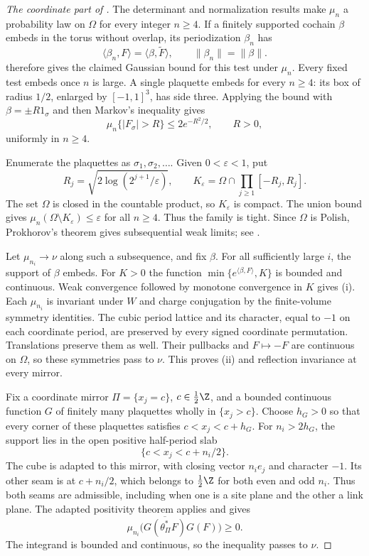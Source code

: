 \begin{proof}[The coordinate part of ]
The determinant and normalization results make $\mu_n$ a probability
law on $\Omega$ for every integer $n\ge4$. If a finitely supported
cochain $\beta$ embeds in the torus without overlap, its
periodization $\beta_n$ has
\[
 \langle\beta_n,F\rangle=\langle\beta,\widetilde F\rangle,
 \qquad \|\beta_n\|=\|\beta\|.
\]
 therefore gives the claimed Gaussian
bound for this test under $\mu_n$. Every fixed test embeds once
$n$ is large. A single plaquette embeds for every $n\ge4$: its
box of radius $1/2$, enlarged by $[-1,1]^3$, has side three.
Applying the bound with $\beta=\pm R1_\sigma$ and then Markov's
inequality gives
\[
 \mu_n\{|F_\sigma|>R\}\le2e^{-R^2/2},\qquad R>0,
\]
uniformly in $n\ge4$.

Enumerate the plaquettes as $\sigma_1,\sigma_2,\ldots$. Given
$0<\varepsilon<1$, put
\[
 R_j=\sqrt{2\log(2^{j+1}/\varepsilon)},\qquad
 K_\varepsilon=\Omega\cap\prod_{j\ge1}[-R_j,R_j].
\]
The set $\Omega$ is closed in the countable product, so
$K_\varepsilon$ is compact. The union bound gives
$\mu_n(\Omega\setminus K_\varepsilon)\le\varepsilon$ for all
$n\ge4$. Thus the family is tight. Since $\Omega$ is Polish,
Prokhorov's theorem gives subsequential weak limits; see
\cite[Theorem~1.1]{Sorensen}.

Let $\mu_{n_i}\to\nu$ along such a subsequence, and fix $\beta$.
For all sufficiently large $i$, the support of $\beta$ embeds.
For $K>0$ the function
$\min\{e^{\langle\beta,F\rangle},K\}$ is bounded and continuous.
Weak convergence followed by monotone convergence in $K$ gives
\textup{(i)}. Each $\mu_{n_i}$ is invariant under $W$ and charge
conjugation by the finite-volume symmetry identities. The cubic
period lattice and its character, equal to $-1$ on each coordinate
period, are preserved by every signed coordinate permutation.
Translations preserve them as well. Their pullbacks and $F\mapsto-F$
are continuous on $\Omega$, so these symmetries pass to $\nu$.
This proves \textup{(ii)} and reflection invariance at every mirror.

Fix a coordinate mirror $\Pi=\{x_j=c\}$, $c\in\tfrac12\Z$,
and a bounded continuous function $G$ of finitely many plaquettes
wholly in $\{x_j>c\}$. Choose $h_G>0$ so that every corner of
these plaquettes satisfies $c<x_j<c+h_G$. For $n_i>2h_G$, the
support lies in the open positive half-period slab
\[
 \{c<x_j<c+n_i/2\}.
\]
The cube is adapted to this mirror, with closing vector $n_ie_j$
and character $-1$. Its other seam is at $c+n_i/2$, which belongs
to $\tfrac12\Z$ for both even and odd $n_i$. Thus both seams are
admissible, including when one is a site plane and the other a
link plane. The adapted positivity theorem applies and gives
\[
 \mu_{n_i}\bigl(\overline{G(\theta_\Pi^*F)}G(F)\bigr)\ge0.
\]
The integrand is bounded and continuous, so the inequality passes
to $\nu$.


\end{proof}
